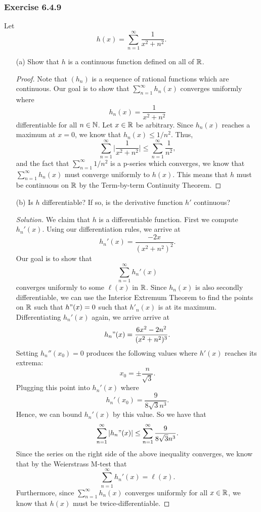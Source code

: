 \subsubsection{Exercise 6.4.9} Let 
\[  h(x) = \sum_{ n=1 }^{ \infty  } \frac{ 1 }{ x^2 +n^2  }. \]
\begin{enumerate}
    \item[(a)] Show that \( h  \) is a continuous function defined on all of \( \mathbb{R}  \).
        \begin{proof}
        Note that \( (h_n)  \) is a sequence of rational functions which are continuous. Our goal is to show that \( \sum_{ n=1 }^{ \infty  } h_n(x)  \) converges uniformly where 
        \[  h_n(x) = \frac{ 1 }{ x^2 + n^2  }\] differentiable for all \(  n \in \mathbb{N}  \).  Let \( x \in \mathbb{R}  \) be arbitrary. Since \( h_n(x)  \) reaches a maximum at \( x = 0  \), we know that \( h_n(x) \leq 1 / n^2  \). Thus,
        \[  \sum_{ n=1 }^{ \infty  } \Big| \frac{ 1 }{ x^2 + n^2 } \Big|  \leq \sum_{ n=1 }^{ \infty  } \frac{ 1 }{ n^2  },   \]
        and the fact that \( \sum_{ n=1 }^{ \infty  } 1 / n^{2} \) is a p-series which converges, we know that \( \sum_{ n=1 }^{ \infty  } h_n(x)   \) must converge uniformly to \( h(x)  \). This means that \( h  \) must be continuous on \( \mathbb{R}  \) by the Term-by-term Continuity Theorem.
        \end{proof}
    \item[(b)] Is \( h  \) differentiable? If so, is the derivative function \( h' \) continuous? 
        \begin{proof}[Solution]
        We claim that \( h  \) is a differentiable function. First we compute \( h_n'(x)  \). Using our differentiation rules, we arrive at
        \[  h_n'(x) = \frac{ -2x  }{ (x^2 + n^2 )^2 }.  \]
        Our goal is to show that 
        \[  \sum_{ n=1 }^{ \infty  } h_n'(x)   \]
        converges uniformly to some \( \ell(x)  \) in \( \mathbb{R}  \). Since \( h_n(x)  \) is also secondly differentiable, we can use the Interior Extremum Theorem to find the points on \( \mathbb{R}  \) such that \( h"(x) = 0   \) such that \( h'_n(x)  \) is at its maximum. Differentiating \( h_n'(x)  \) again, we arrive arrive at 
        \[  h_n"(x) = \frac{ 6x^2 - 2n^2  }{ (x^2 + n^2 )^3 }.  \]
        Setting \( h_n''(x_0) = 0  \) produces the following values where \( h'(x)  \) reaches its extrema:
        \[  x_0 = \pm \frac{ n }{ \sqrt{ 3 }  }. \] Plugging this point into \( h_n'(x)  \) where
        \[  h_n'(x_0) = \frac{ 9 }{ 8\sqrt{ 3 }  n^3  }.  \]
        Hence, we can bound \( h_n'(x)  \) by this value. So we have that 
        \[ \sum_{ n=1 }^{ \infty  } | h_n"(x) |  \leq \sum_{ n=1 }^{ \infty  } \frac{ 9 }{ 8 \sqrt{ 3 } n^3  }.  \]
        Since the series on the right side of the above inequality converges, we know that by the  Weierstrass M-test that 
        \[  \sum_{ n=1 }^{ \infty  } h_n'(x) = \ell(x).  \]
        Furthermore, since \( \sum_{ n = 1 }^{  \infty } h_n(x)  \) converges uniformly for all \( x \in \mathbb{R}  \), we know that \( h(x)  \) must be twice-differentiable.
        
        \end{proof}
\end{enumerate}




